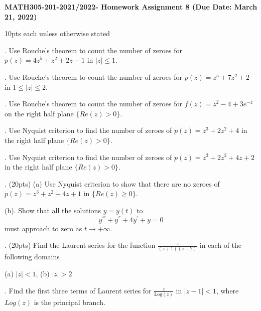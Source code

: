 %
%
\textwidth=6.8in
\textheight=8.8in
\oddsidemargin=-0.1in
\evensidemargin=-0.1in








\noindent
{\bf MATH305-201-2021/2022- Homework Assignment 8 (Due Date: March 21, 2022) }

\vskip 0.5cm

 10pts each unless otherwise stated

\medskip


. Use Rouche's theorem to count the number of zeroes for $ p(z)= 4z^5+z^2+2z-1 $ in $|z|\leq 1$.

\medskip



. Use Rouche's theorem to count the number of zeroes for $ p(z)= z^5 + 7 z^2+2 $ in $ 1\leq |z| \leq 2 $.




\medskip

. Use Rouche's theorem to count the number of zeroes for $ f(z)= z^2-4 + 3 e^{-z}$ on the right half plane $ \{ Re (z)>0\}$.


\medskip

. Use Nyquist criterion to find the number of zeroes of $ p(z)= z^3+2z^2 +4$ in the right half plane $ \{ Re(z)>0\}$.


\medskip

. Use Nyquist criterion to find the number of zeroes of $ p(z)= z^3+2z^2+4z +2$ in the right half plane $ \{ Re(z)>0\}$.


\medskip

. (20pts)  (a) Use Nyquist criterion to show that there are no zeroes of $ p(z)= z^3+z^2+4z+1$ in  $\{ Re(z) \geq 0\}$.

(b). Show that all  the solutions $ y= y(t)$ to
$$ y^{'''}+ y^{''} + 4 y^{'} +y=0$$
must approach to zero as $ t\to +\infty$.



\medskip

. (20pts) Find the Laurent series for the function $ \frac{z}{ (z+1)(z-2)}$ in each of the following domains

(a) $ |z|<1$,  (b) $ |z|>2$

\medskip

. Find the first three terms of Laurent series for $\frac{z}{ \mbox{Log} (z)}$   in $|z-1| <1$, where $ Log (z)$ is the principal branch.















